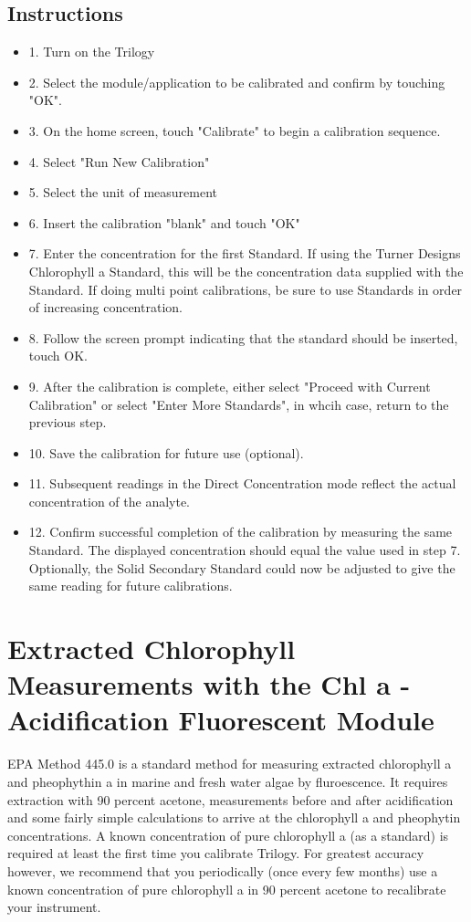 \documentclass[12pt]{../SOP3_beta}\usepackage[]{graphicx}\usepackage[]{color}
\begin{document}
\subsection{Instructions}
\begin{itemize}
  \item 1. Turn on the Trilogy
  \item 2. Select the module/application to be calibrated and confirm by touching "OK".
  \item 3. On the home screen, touch "Calibrate" to begin a calibration sequence.
  \item 4. Select "Run New Calibration"
  \item 5. Select the unit of measurement 
  \item 6. Insert the calibration "blank" and touch "OK"
  \item 7. Enter the concentration for the first Standard. If using the Turner Designs Chlorophyll a Standard, this will be the concentration data supplied with the Standard. If doing multi point calibrations, be sure to use Standards in order of increasing concentration.
  \item 8. Follow the screen prompt indicating that the standard should be inserted, touch OK.
  \item 9. After the calibration is complete, either select "Proceed with Current Calibration" or select "Enter More Standards", in whcih case, return to the previous step.
  \item 10. Save the calibration for future use (optional).
  \item 11. Subsequent readings in the Direct Concentration mode reflect the actual concentration of the analyte. 
  \item 12. Confirm successful completion of the calibration by measuring the same Standard. The displayed concentration should equal the value used in step 7. Optionally, the Solid Secondary Standard could now be adjusted to give the same reading for future calibrations.
\end{itemize}

\section{Extracted Chlorophyll Measurements with the Chl a -Acidification Fluorescent Module}
\NP EPA Method 445.0 is a standard method for measuring extracted chlorophyll a and pheophythin a in marine and fresh water algae by fluroescence. It requires extraction with 90 percent acetone, measurements before and after acidification and some fairly simple calculations to arrive at the chlorophyll a and pheophytin concentrations.
\NP A known concentration of pure chlorophyll a (as a standard) is required at least the first time you calibrate Trilogy. For greatest accuracy however, we recommend that you periodically (once every few months) use a known concentration of pure chlorophyll a in 90 percent acetone to recalibrate your instrument. 
\end{document}

